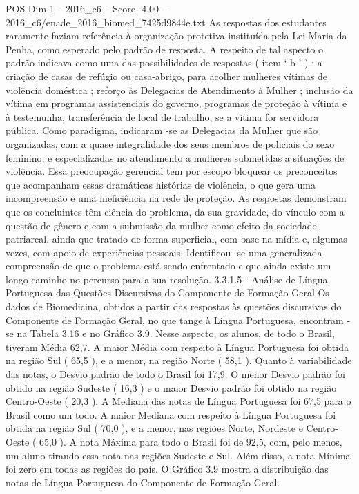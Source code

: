 \begin{textsample}{POS Dim 1 – 2016\_c6 – Score -4.00 – 2016\_c6/enade\_2016\_biomed\_7425d9844e.txt}
As respostas dos estudantes raramente faziam referência à organização protetiva instituída pela Lei Maria da Penha, como esperado pelo padrão de resposta.
A respeito de tal aspecto o padrão indicava como uma das possibilidades de respostas ( item ‘ b ’ ) : a criação de casas de refúgio ou casa-abrigo, para acolher mulheres vítimas de violência doméstica ; reforço às Delegacias de Atendimento à Mulher ; inclusão da vítima em programas assistenciais do governo, programas de proteção à vítima e à testemunha, transferência de local de trabalho, se a vítima for servidora pública.
Como paradigma, indicaram -se as Delegacias da Mulher que são organizadas, com a quase integralidade dos seus membros de policiais do sexo feminino, e especializadas no atendimento a mulheres submetidas a situações de violência.
Essa preocupação gerencial tem por escopo bloquear os preconceitos que acompanham essas dramáticas histórias de violência, o que gera uma incompreensão e uma ineficiência na rede de proteção.
As respostas demonstram que os concluintes têm ciência do problema, da sua gravidade, do vínculo com a questão de gênero e com a submissão da mulher como efeito da sociedade patriarcal, ainda que tratado de forma superficial, com base na mídia e, algumas vezes, com apoio de experiências pessoais.
Identificou -se uma generalizada compreensão de que o problema está sendo enfrentado e que ainda existe um longo caminho no percurso para a sua resolução. 3.3.1.5 - Análise de Língua Portuguesa das Questões Discursivas do Componente de Formação Geral Os dados de Biomedicina, obtidos a partir das respostas às questões discursivas do Componente de Formação Geral, no que tange à Língua Portuguesa, encontram -se na Tabela 3.16 e no Gráfico 3.9.
Nesse aspecto, os alunos, de todo o Brasil, tiveram Média 62,7.
A maior Média com respeito à Língua Portuguesa foi obtida na região Sul ( 65,5 ), e a menor, na região Norte ( 58,1 ).
Quanto à variabilidade das notas, o Desvio padrão de todo o Brasil foi 17,9.
O menor Desvio padrão foi obtido na região Sudeste ( 16,3 ) e o maior Desvio padrão foi obtido na região Centro-Oeste ( 20,3 ).
A Mediana das notas de Língua Portuguesa foi 67,5 para o Brasil como um todo.
A maior Mediana com respeito à Língua Portuguesa foi obtida na região Sul ( 70,0 ), e a menor, nas regiões Norte, Nordeste e Centro-Oeste ( 65,0 ).
A nota Máxima para todo o Brasil foi de 92,5, com, pelo menos, um aluno tirando essa nota nas regiões Sudeste e Sul.
Além disso, a nota Mínima foi zero em todas as regiões do país.
O Gráfico 3.9 mostra a distribuição das notas de Língua Portuguesa do Componente de Formação Geral.

\end{textsample}
